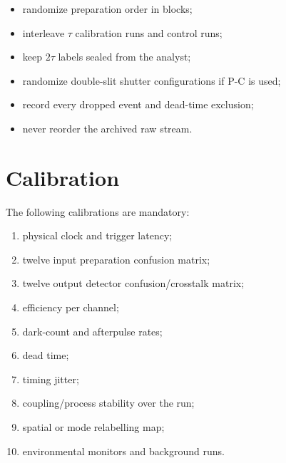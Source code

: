 \documentclass[11pt,a4paper,openany]{report}
\begin{document}
\begin{itemize}
\item 
randomize preparation order in blocks;

\item 
interleave \(\tau\) calibration runs and control runs;

\item 
keep \(2\tau\) labels sealed from the analyst;

\item 
randomize double-slit shutter configurations if P-C is used;

\item 
record every dropped event and dead-time exclusion;

\item 
never reorder the archived raw stream.

\end{itemize}

\section{Calibration}

The following calibrations are mandatory:

\begin{enumerate}
\item 
physical clock and trigger latency;

\item 
twelve input preparation confusion matrix;

\item 
twelve output detector confusion/\allowbreak{}crosstalk matrix;

\item 
efficiency per channel;

\item 
dark-count and afterpulse rates;

\item 
dead time;

\item 
timing jitter;

\item 
coupling/\allowbreak{}process stability over the run;

\item 
spatial or mode relabelling map;

\item 
environmental monitors and background runs.

\end{enumerate}
\end{document}
